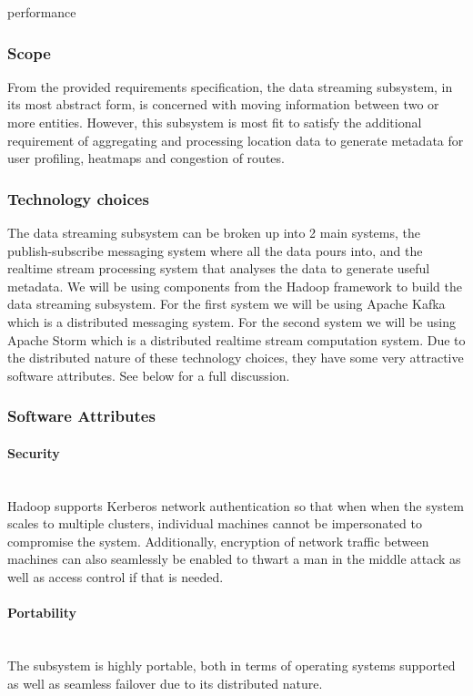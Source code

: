 performance\subsubsection{Scope}
From the provided requirements specification, the data streaming subsystem, in its most abstract form, is concerned with moving information between two or more entities. However, this subsystem is most fit to satisfy the additional requirement of aggregating and processing location data to generate metadata for user profiling, heatmaps and congestion of routes.

\subsubsection{Technology choices}
The data streaming subsystem can be broken up into 2 main systems, the publish-subscribe messaging system where all the data pours into, and the realtime stream processing system that analyses the data to generate useful metadata.
We will be using components from the Hadoop framework to build the data streaming subsystem. For the first system we will be using Apache Kafka which is a distributed messaging system. For the second system we will be using Apache Storm which is a distributed realtime stream computation system. Due to the distributed nature of these technology choices, they have some very attractive software attributes. See below for a full discussion.

\subsubsection{Software Attributes}

\paragraph{Security}
\mbox{}\\
    Hadoop supports Kerberos network authentication so that when when the system scales to multiple clusters, individual machines cannot be impersonated to compromise the system. Additionally, encryption of network traffic between machines can also seamlessly be enabled to thwart a man in the middle attack as well as access control if that is needed.
\paragraph{Portability}
\mbox{}\\
The subsystem is highly portable, both in terms of operating systems supported as well as seamless failover due to its distributed nature.
